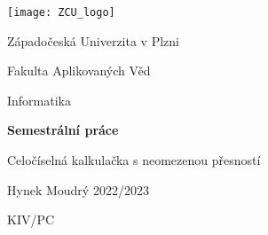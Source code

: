 \begin{titlepage}
	\begin{center}
		\vspace*{1cm}
		\texttt{[image: ZCU\_logo]}
		\vspace{3cm}

		\Large{Západočeská Univerzita v Plzni}
		\vspace{0.5cm}

		\large{Fakulta Aplikovaných Věd}
		\vspace{0.5cm}

		\large{Informatika}
		\vspace{1cm}

   		\Huge{\textbf{Semestrální práce}}
   		\vspace{0.8cm}

		\LARGE{Celočíselná kalkulačka s neomezenou přesností}
	\end{center}
	
  	\vfill

  	\LARGE{Hynek Moudrý}
	\hfill
	\Large{2022/2023}

	\Large{KIV/PC}
\end{titlepage}